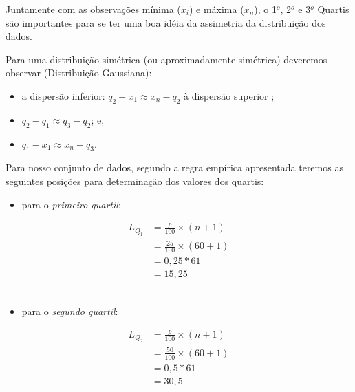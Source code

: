 \documentclass[
]{book}
\providecommand{\tightlist}{%
  \setlength{\itemsep}{0pt}\setlength{\parskip}{0pt}}
\begin{document}
\hfill\break

Juntamente com as observações mínima (\(x_{i}\)) e máxima (\(x_{n}\)), o 1\(^{o}\), 2\(^{o}\) e 3\(^{o}\) Quartis são importantes para se ter uma boa idéia da assimetria da distribuição dos dados.

\hfill\break

Para uma distribuição simétrica (ou aproximadamente simétrica) deveremos observar (Distribuição Gaussiana):

\hfill\break

\begin{itemize}
\tightlist
\item
  a dispersão inferior: \(q_{2} - x_{1} \approx x_{n} - q_{2}\) à dispersão superior ;
\item
  \(q_{2} - q_{1} \approx q_{3} - q_{2}\); e,
\item
  \(q_{1} - x_{1} \approx x_{n} - q_{3}\).
\end{itemize}

\hfill\break

Para nosso conjunto de dados, segundo a regra empírica apresentada teremos as seguintes posições para determinação dos valores dos quartis:

\hfill\break

\begin{itemize}
\tightlist
\item
  para o \emph{primeiro quartil}:
\end{itemize}

\begin{align*}
L_{Q_{1}} & =\frac{p}{100} \times (n+1) \\
          & =\frac{25}{100} \times (60+1) \\
          & = 0,25*61 \\
          & = 15,25
\end{align*}\\

\begin{itemize}
\tightlist
\item
  para o \emph{segundo quartil}:
\end{itemize}

\begin{align*}
L_{Q_{2}} & =\frac{p}{100} \times (n+1) \\
          & =\frac{50}{100} \times (60+1) \\
          & = 0,5*61 \\
          & = 30,5
\end{align*}
\end{document}
